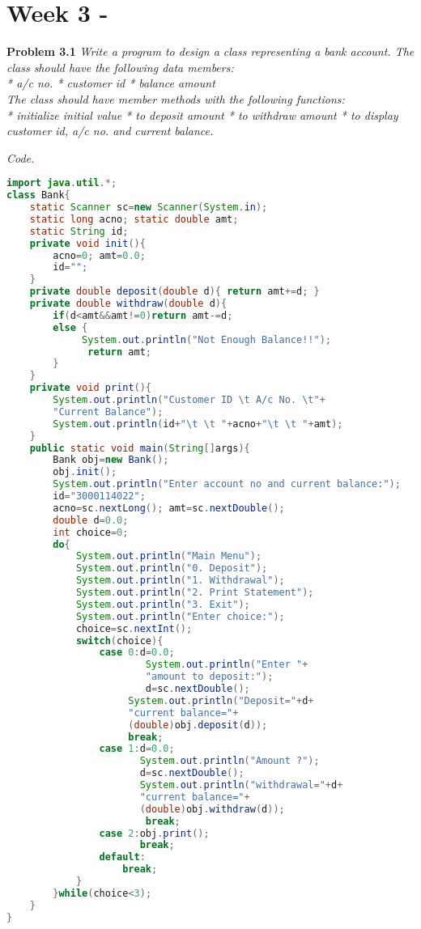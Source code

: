 \documentclass[12pt]{article}
\begin{document}
\section{Week 3 - }

\textbf{Problem 3.1} \textit{Write a program to design a class representing a bank account. The class should have the following data members:\\
* a/c no. * customer id * balance amount\\
The class should have member methods with the following functions:\\
* initialize initial value
* to deposit amount
* to withdraw amount
* to display customer id, a/c no. and current balance.}


\textit{Code.}

\begin{lstlisting}[language=Java]
import java.util.*;
class Bank{
	static Scanner sc=new Scanner(System.in);
	static long acno; static double amt;
	static String id;
	private void init(){
		acno=0; amt=0.0;
		id="";
	}
	private double deposit(double d){ return amt+=d; }
	private double withdraw(double d){
		if(d<amt&&amt!=0)return amt-=d;
		else {
			 System.out.println("Not Enough Balance!!");
			  return amt;
		}
	}
	private void print(){
		System.out.println("Customer ID \t A/c No. \t"+
		"Current Balance");
		System.out.println(id+"\t \t "+acno+"\t \t "+amt);
	}
	public static void main(String[]args){
		Bank obj=new Bank();
		obj.init();
		System.out.println("Enter account no and current balance:");
		id="3000114022";
		acno=sc.nextLong(); amt=sc.nextDouble();
		double d=0.0;
		int choice=0;
		do{
			System.out.println("Main Menu");
			System.out.println("0. Deposit");
			System.out.println("1. Withdrawal");
			System.out.println("2. Print Statement");
			System.out.println("3. Exit");
			System.out.println("Enter choice:");
			choice=sc.nextInt();
			switch(choice){
				case 0:d=0.0;
				        System.out.println("Enter "+
				        "amount to deposit:");
				        d=sc.nextDouble();
					 System.out.println("Deposit="+d+
					 "current balance="+
					 (double)obj.deposit(d));
					 break;
				case 1:d=0.0;
				       System.out.println("Amount ?");
				       d=sc.nextDouble();
				       System.out.println("withdrawal="+d+
				       "current balance="+
				       (double)obj.withdraw(d));
				        break;
				case 2:obj.print();
				       break;
				default:
					break;
			}
		}while(choice<3);
	}
}

\end{lstlisting}
\end{document}
